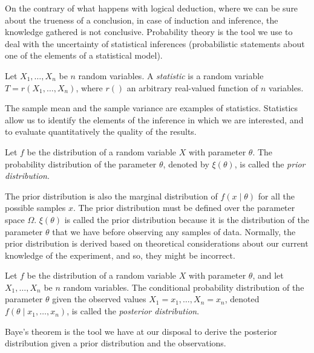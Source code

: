 On the contrary of what happens with logical deduction, where we can be sure about the trueness of a conclusion, in case of induction and inference, the knowledge gathered is not conclusive. Probability theory is the tool we use to deal with the uncertainty of statistical inferences (probabilistic statements about one of the elements of a statistical model).

\begin{definition}
Let $X_1, \ldots, X_n$ be $n$ random variables. A \emph{statistic} is a random variable $T = r \left( X_1, \ldots, X_n \right)$, where $r()$ an arbitrary real-valued function of $n$ variables.
\end{definition}

The sample mean and the sample variance are examples of statistics. Statistics allow us to identify the elements of the inference in which we are interested, and to evaluate quantitatively the quality of the results.

\begin{definition}
Let $f$ be the distribution of a random variable $X$ with parameter $\theta$. The probability distribution of the parameter $\theta$, denoted by $\xi\left(\theta\right)$, is called the \emph{prior distribution}.
\end{definition}

The prior distribution is also the marginal distribution of $f(x \mid \theta)$ for all the possible samples $x$. The prior distribution must be defined over the parameter space $\Omega$. $\xi\left(\theta\right)$ is called the prior distribution because it is the distribution of the parameter $\theta$ that we have before observing any samples of data. Normally, the prior distribution is derived based on theoretical considerations about our current knowledge of the experiment, and so, they might be incorrect.

\begin{definition}
Let $f$ be the distribution of a random variable $X$ with parameter $\theta$, and let $X_1, \ldots, X_n$ be $n$ random variables. The conditional probability distribution of the parameter $\theta$ given the observed values $X_1 = x_1, \ldots, X_n = x_n$, denoted $f \left( \theta \mid x_1, \ldots, x_n \right)$, is called the \emph{posterior distribution}.
\end{definition}

Baye's theorem is the tool we have at our disposal to derive the posterior distribution given a prior distribution and the observations.

